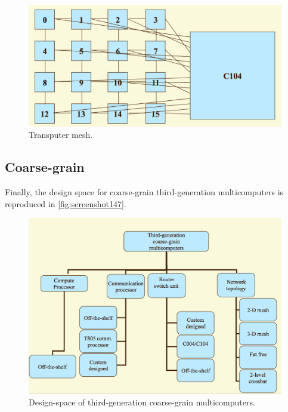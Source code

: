 \begin{figure}
\centering
\includegraphics[width=0.7\linewidth]{figures/screenshot146}
\caption{Transputer mesh.}
\label{fig:screenshot146}
\end{figure}

\subsection{Coarse-grain}
Finally, the design space for coarse-grain third-generation multicomputers is reproduced in \autoref{fig:screenshot147}.

\begin{figure}
\centering
\includegraphics[width=\linewidth]{figures/screenshot147}
\caption{Design-space of third-generation coarse-grain multicomputers.}
\label{fig:screenshot147}
\end{figure}

